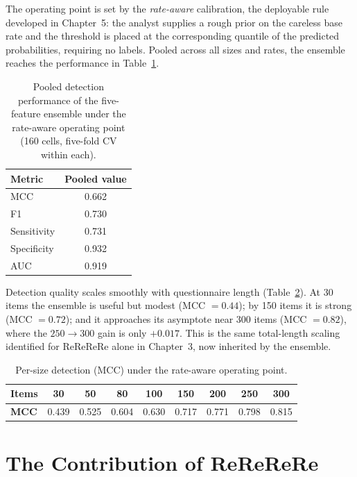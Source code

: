 The operating point is set by the \emph{rate-aware} calibration, the deployable
rule developed in Chapter~5: the analyst supplies a rough prior on the careless
base rate and the threshold is placed at the corresponding quantile of the
predicted probabilities, requiring no labels. Pooled across all sizes and rates,
the ensemble reaches the performance in Table~\ref{tab:headline}.

\begin{table}[t]
\centering
\caption{Pooled detection performance of the five-feature ensemble under the
rate-aware operating point (160 cells, five-fold CV within each).}
\label{tab:headline}
\small
\begin{tabular}{l c}
\toprule
\textbf{Metric} & \textbf{Pooled value} \\
\midrule
MCC          & 0.662 \\
F1           & 0.730 \\
Sensitivity  & 0.731 \\
Specificity  & 0.932 \\
AUC          & 0.919 \\
\bottomrule
\end{tabular}
\end{table}

Detection quality scales smoothly with questionnaire length
(Table~\ref{tab:scaling}). At 30 items the ensemble is useful but modest
(MCC $= 0.44$); by 150 items it is strong (MCC $= 0.72$); and it approaches its
asymptote near 300 items (MCC $= 0.82$), where the $250 \rightarrow 300$ gain is
only $+0.017$. This is the same total-length scaling identified for ReReReRe
alone in Chapter~3, now inherited by the ensemble.

\begin{table}[t]
\centering
\caption{Per-size detection (MCC) under the rate-aware operating point.}
\label{tab:scaling}
\small
\begin{tabular}{l c c c c c c c c}
\toprule
\textbf{Items} & 30 & 50 & 80 & 100 & 150 & 200 & 250 & 300 \\
\midrule
\textbf{MCC} & 0.439 & 0.525 & 0.604 & 0.630 & 0.717 & 0.771 & 0.798 & 0.815 \\
\bottomrule
\end{tabular}
\end{table}

\section{The Contribution of ReReReRe}

